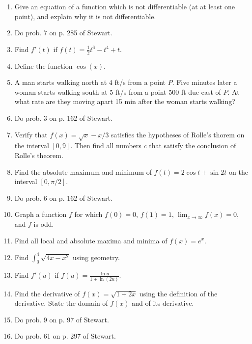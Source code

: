 \documentclass[12pt]{article}
\begin{document}
\begin{enumerate}[(1)]
\item
Give an equation of a function which is not differentiable (at at least one point), and
explain why it is not differentiable.

\item
Do prob. 7 on p. 285 of Stewart.

\item
Find $f'(t)$ if $f(t) = \frac{1}{2} t^6 - t^4 + t$.

\item
Define the function $\cos(x)$.

\item
A man starts walking north at 4 ft/s from a point $P$. Five minutes later a woman starts
walking south at 5 ft/s from a point 500 ft due east of $P$. At what rate are they moving apart
15 min after the woman starts walking?

\item
Do prob. 3 on p. 162 of Stewart.

\item
Verify that $f(x) = \sqrt{x} - x/3$ satisfies the hypotheses of Rolle's thorem
on the interval $[0, 9]$. Then find all numbers $c$ that satisfy the conclusion of Rolle's
theorem.

\item
Find the absolute maximum and minimum of $f(t) = 2 \cos t + \sin 2t$ on the interval
$[0, \pi/2]$.

\item
Do prob. 6 on p. 162 of Stewart.

\item
Graph a function $f$ for which $f(0) = 0$, $f(1) = 1$, $\lim_{x \rightarrow \infty} f(x) = 0$,
and $f$ is odd.

\item
Find all local and absolute maxima and minima of $f(x) = e^x$.

\item
Find $\int_0^4 \sqrt{4x - x^2}$ using geometry.

\item
Find $f'(u)$ if $f(u) = \frac{\ln u}{1 + \ln(2u)}$.

\item
Find the derivative of $f(x) = \sqrt{1 + 2x}$ using the definition of the derivative.
State the domain of $f(x)$ and of its derivative.

\item
Do prob. 9 on p. 97 of Stewart.

\item
Do prob. 61 on p. 297 of Stewart.


\end{enumerate}
\end{document}
